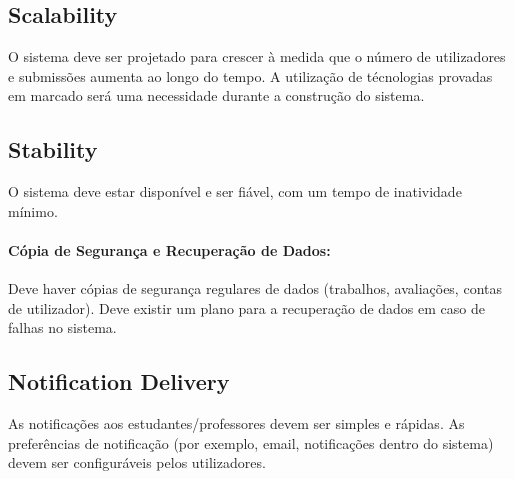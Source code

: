\documentclass[10pt]{article}
\begin{document}
\subsection{Scalability}
O sistema deve ser projetado para crescer à medida que o número de utilizadores e submissões aumenta ao longo do tempo.
A utilização de técnologias provadas em marcado será uma necessidade durante a construção do sistema.

\subsection{Stability}
O sistema deve estar disponível e ser fiável, com um tempo de inatividade mínimo.

\paragraph{Cópia de Segurança e Recuperação de Dados:}
Deve haver cópias de segurança regulares de dados (trabalhos, avaliações, contas de utilizador).
Deve existir um plano para a recuperação de dados em caso de falhas no sistema.

\subsection{Notification Delivery}
As notificações aos estudantes/professores devem ser simples e rápidas. 
As preferências de notificação (por exemplo, email, notificações dentro do sistema) devem ser configuráveis pelos utilizadores.
\end{document}
